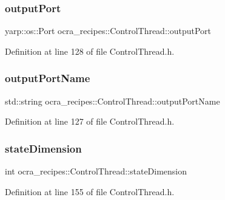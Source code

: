 \subsubsection{\texorpdfstring{output\+Port}{outputPort}}
{\footnotesize\ttfamily yarp\+::os\+::\+Port ocra\+\_\+recipes\+::\+Control\+Thread\+::output\+Port\hspace{0.3cm}{\ttfamily [protected]}}



Definition at line 128 of file Control\+Thread.\+h.

\hypertarget{classocra__recipes_1_1ControlThread_a150b524cf8af131ac4d7a497777a2d87}{}\label{classocra__recipes_1_1ControlThread_a150b524cf8af131ac4d7a497777a2d87} 
\subsubsection{\texorpdfstring{output\+Port\+Name}{outputPortName}}
{\footnotesize\ttfamily std\+::string ocra\+\_\+recipes\+::\+Control\+Thread\+::output\+Port\+Name\hspace{0.3cm}{\ttfamily [protected]}}



Definition at line 127 of file Control\+Thread.\+h.

\hypertarget{classocra__recipes_1_1ControlThread_a1ab9aaa641766b8bf29812925701a52f}{}\label{classocra__recipes_1_1ControlThread_a1ab9aaa641766b8bf29812925701a52f} 
\subsubsection{\texorpdfstring{state\+Dimension}{stateDimension}}
{\footnotesize\ttfamily int ocra\+\_\+recipes\+::\+Control\+Thread\+::state\+Dimension\hspace{0.3cm}{\ttfamily [protected]}}



Definition at line 155 of file Control\+Thread.\+h.

\hypertarget{classocra__recipes_1_1ControlThread_abbc082e54db816a3298c3e5ae5d3f9ef}{}\label{classocra__recipes_1_1ControlThread_abbc082e54db816a3298c3e5ae5d3f9ef} 
